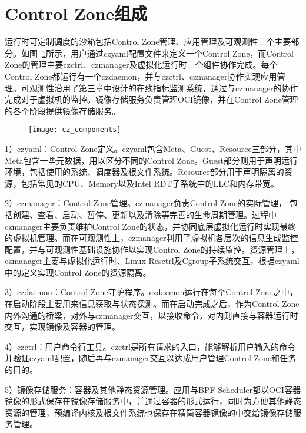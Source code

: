 \section{Control Zone组成}


运行时可定制调度的沙箱包括Control Zone管理、应用管理及可观测性三个主要部分。如图~\ref{fig:cz_components}所示，用户通过czyaml配置文件来定义一个Control Zone，而Control Zone的管理主要czctrl、czmanager及虚拟化运行时三个组件协作完成。每个Control Zone都运行有一个czdaemon，并与czctrl、czmanager协作实现应用管理。可观测性沿用了第三章中设计的在线指标监测系统，通过与czmanager的协作完成对于虚拟机的监控。镜像存储服务负责管理OCI镜像，并在Control Zone管理的各个阶段提供镜像存储服务。

\begin{figure}[!htbp]
    \centering
    \texttt{[image: cz\_components]}
    \label{fig:cz_components}
\end{figure}

1）czyaml：Control Zone定义。czyaml包含Meta、Guest、Resource三部分，其中Meta包含一些元数据，用以区分不同的Control Zone。Guest部分则用于声明运行环境，包括使用的系统、调度器及根文件系统。Resource部分用于声明隔离的资源，包括常见的CPU、Memory以及Intel RDT子系统中的LLC和内存带宽。

2）czmanager：Control Zone管理。czmanager负责Control Zone的实际管理， 包括创建、查看、启动、暂停、更新以及清除等完善的生命周期管理。过程中czmanager主要负责维护Control Zone的状态，并协同底层虚拟化运行时实现最终的虚拟机管理。而在可观测性上，czmanager利用了虚拟机各层次的信息生成监控配置，并与可观测性基础设施协作以实现Control Zone的持续监控。资源管理上，czmanager主要与虚拟化运行时、Linux Resctrl及Cgroup子系统交互，根据czyaml中的定义实现Control Zone的资源隔离。

3）czdaemon：Control Zone守护程序。czdaemon运行在每个Control Zone之中，在启动阶段主要用来信息获取与状态探测。而在启动完成之后，作为Control Zone内外沟通的桥梁，对外与czmanager交互，以接收命令，对内则直接与容器运行时交互，实现镜像及容器的管理。

4）czctrl：用户命令行工具。czctrl是所有请求的入口，能够解析用户输入的命令并验证czyaml配置，随后再与czmanager交互以达成用户管理Control Zone和任务的目的。

5）镜像存储服务：容器及其他静态资源管理。应用与BPF Scheduler都以OCI容器镜像的形式保存在镜像存储服务中，并通过容器的形式运行，同时为方便其他静态资源的管理，预编译内核及根文件系统也保存在精简容器镜像的中交给镜像存储服务管理。

